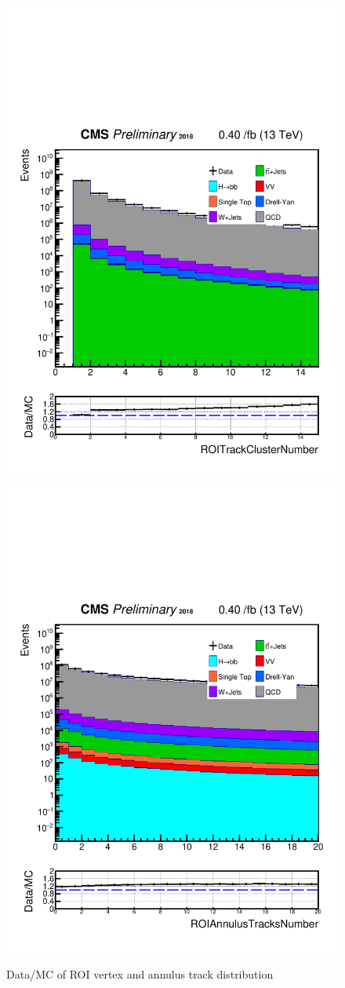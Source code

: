 \begin{figure}[h!]
  \caption{Data/MC of ROI vertex and annulus track distribution}
  \label{fig:2ROIs}
  \centering
  \includegraphics[width=0.47\linewidth]{figs/Data_AnalysisNoteplot_MS-15_ctauS-10_ROITrackClusterNumber.pdf}
  \includegraphics[width=0.47\linewidth]{figs/Data_AnalysisNoteplot_MS-15_ctauS-10_ROIAnnulusTracksNumber.pdf}
\end{figure}
